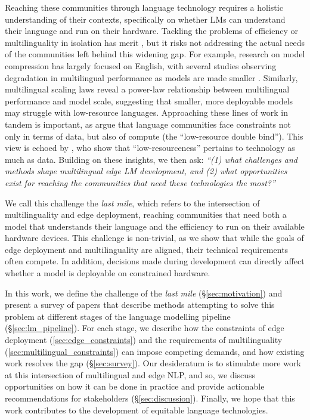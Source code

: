 \documentclass[11pt,a4paper]{article}
\begin{document}
Reaching these communities through language technology requires a holistic understanding of their contexts, specifically on whether LMs can understand their language and run on their hardware.
Tackling the problems of efficiency or multilinguality in isolation has merit \citep{ruder-etal-2022-square}, but it risks not addressing the actual needs of the communities left behind this widening gap.
For example, research on model compression has largely focused on English, with several studies observing degradation in multilingual performance as models are made smaller \citep{ogueji-etal-2022-intriguing,mohammadshahi-etal-2022-compressed,marchisio-etal-2024-quantization}.
Similarly, multilingual scaling laws \citep{longpre2025atlasadaptivetransferscaling,he-etal-2025-scaling} reveal a power-law relationship between multilingual performance and model scale, suggesting that smaller, more deployable models may struggle with low-resource languages.
Approaching these lines of work in tandem is important, as \citet{ahia-etal-2021-low-resource} argue that language communities face constraints not only in terms of data, but also of compute (the ``low-resource double bind'').
This view is echoed by \citet{nigatu-etal-2024-zenos}, who show that ``low-resourceness'' pertains to technology as much as data.
Building on these insights, we then ask: \textit{``(1) what challenges and methods shape multilingual edge LM development, and (2) what opportunities exist for reaching the communities that need these technologies the most?''}

We call this challenge the \textit{last mile}, which refers to the intersection of multilinguality and edge deployment,
reaching communities that need both a model that understands their language and the efficiency to run on their available hardware devices.
This challenge is non-trivial, as we show that while the goals of edge deployment and multilinguality are aligned, their technical requirements often compete.
In addition, decisions made during development can directly affect whether a model is deployable on constrained hardware.

In this work, we define the challenge of the \textit{last mile} (\S\ref{sec:motivation}) and present a survey of \numpapers{} papers that describe methods attempting to solve this problem at different stages of the language modelling pipeline (\S\ref{sec:lm_pipeline}).
For each stage, we describe how the constraints of edge deployment (\ref{sec:edge_constraints}) and the requirements of multilinguality (\ref{sec:multilingual_constraints}) can impose competing demands, and how existing work resolves the gap (\S\ref{sec:survey}).
Our desideratum is to stimulate more work at this intersection of multilingual and edge NLP,
and so, we discuss opportunities on how it can be done in practice and provide actionable recommendations for stakeholders (\S\ref{sec:discussion}).
Finally, we hope that this work contributes to the development of equitable language technologies.
\end{document}

